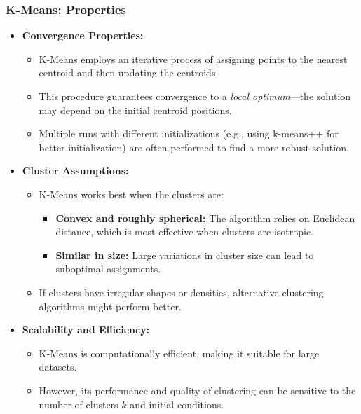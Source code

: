 \documentclass[aspectratio=169]{beamer}
\begin{document}
        \begin{frame}
            \frametitle{K-Means: Properties}
            \begin{itemize}
                \item \textbf{Convergence Properties:}
                \begin{itemize}
                    \item K-Means employs an iterative process of assigning points to the nearest centroid and then updating the centroids.
                    \item This procedure guarantees convergence to a \emph{local optimum}—the solution may depend on the initial centroid positions.
                    \item Multiple runs with different initializations (e.g., using k-means++ for better initialization) are often performed to find a more robust solution.
                \end{itemize}
            \item \textbf{Cluster Assumptions:}
                \begin{itemize}
                    \item K-Means works best when the clusters are:
                        \begin{itemize}
                            \item \textbf{Convex and roughly spherical:} The algorithm relies on Euclidean distance, which is most effective when clusters are isotropic.
                            \item \textbf{Similar in size:} Large variations in cluster size can lead to suboptimal assignments.
                        \end{itemize}
                    \item If clusters have irregular shapes or densities, alternative clustering algorithms might perform better.
                \end{itemize}
            \item \textbf{Scalability and Efficiency:}
                \begin{itemize}
                    \item K-Means is computationally efficient, making it suitable for large datasets.
                    \item However, its performance and quality of clustering can be sensitive to the number of clusters \(k\) and initial conditions.
                \end{itemize}
        \end{itemize}
\end{frame}
        
\end{document}
